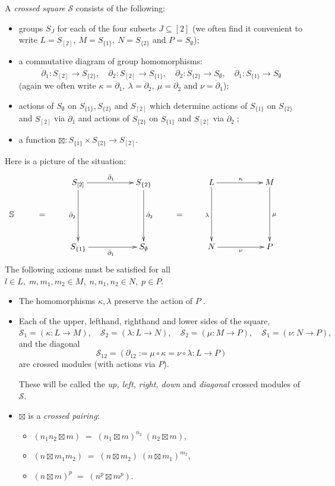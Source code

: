 \documentclass[a4paper,11pt]{report}
\newcommand{\calS}{\mathcal{S}}
\begin{document}
{{ A \emph{crossed square} $\calS$ consists of the following: 
\begin{itemize}
\item  groups $S_J$ for each of the four subsets $J \subseteq [2]$ (we often find it convenient to write $L = S_{[2]},~ M = S_{\{1\}},~ N = S_{\{2\}}$ and $P = S_{\emptyset}$); 
\item  a commutative diagram of group homomorphisms: 
\[ \ddot{\partial}_1 : S_{[2]} \to S_{\{2\}}, \quad \ddot{\partial}_2 : S_{[2]}
\to S_{\{1\}}, \quad \dot{\partial}_2 : S_{\{2\}} \to S_{\emptyset}, \quad
\dot{\partial}_1 : S_{\{1\}} \to S_{\emptyset} \]
 (again we often write $\kappa = \ddot{\partial}_1,~ \lambda = \ddot{\partial}_2,~ \mu =
\dot{\partial}_2$ and $\nu = \dot{\partial}_1$); 
\item  actions of $S_{\emptyset}$ on $S_{\{1\}}, S_{\{2\}}$ and $S_{[2]}$ which determine actions of $S_{\{1\}}$ on $S_{\{2\}}$ and $S_{[2]}$ via $\dot{\partial}_1$ and actions of $S_{\{2\}}$ on $S_{\{1\}}$ and $S_{[2]}$ via $\dot{\partial}_2\;$; 
\item  a function $\boxtimes : S_{\{1\}} \times S_{\{2\}} \to S_{[2]}$. 
\end{itemize}
 Here is a picture of the situation: 
\[ \vcenter{\xymatrix{ & & S_{[2]} \ar[rr]^{\ddot{\partial}_1}
\ar[dd]_{\ddot{\partial}_2} && S_{\{2\}} \ar[dd]^{\dot{\partial}_2} && L
\ar[rr]^{\kappa} \ar[dd]_{\lambda} && M \ar[dd]^{\mu} & \\ \mathbb{S} & = & &&
& = && \\ & & S_{\{1\}} \ar[rr]_{\dot{\partial}_1} && S_{\emptyset} && N
\ar[rr]_{\nu} && P }} \]
 The following axioms must be satisfied for all $l \in L,\; m,m_1,m_2 \in M,\; n,n_1,n_2 \in N,\; p \in P$. 
\begin{itemize}
\item  The homomorphisms $\kappa, \lambda$ preserve the action of $P\;$. 
\item  Each of the upper, left\texttt{}hand, right\texttt{}hand
and lower sides of the square, 
\[ \ddot{\calS}_1 = (\kappa : L \to M), \quad \ddot{\calS}_2 = (\lambda : L \to
N), \quad \dot{\calS}_2 = (\mu : M \to P), \quad \dot{\calS}_1 = (\nu : N \to
P), \]
 and the diagonal 
\[ \calS_{12} = (\partial_{12} := \mu \circ \kappa = \nu \circ \lambda : L \to P) \]
 are crossed modules (with actions via $P$). 

 These will be called the \emph{up, left, right, down} and \emph{diagonal} crossed modules of $\calS$. 
\item  {} $\boxtimes$ is a \emph{crossed pairing}: 
\begin{itemize}
\item  $(n_1n_2 \boxtimes m)\;=\; {(n_1 \boxtimes m)}^{n_2}\;(n_2 \boxtimes m)$, 
\item  $(n \boxtimes m_1m_2) \;=\; (n \boxtimes m_2)\;{(n \boxtimes m_1)}^{m_2}$, 
\item  $(n \boxtimes m)^{p} \;=\; (n^p \boxtimes m^p)$. 
\end{itemize}
 

\end{itemize}}}
\end{document}
